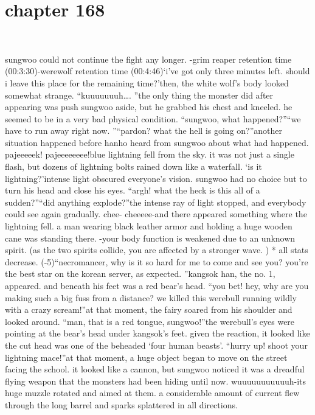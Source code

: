 \section{chapter 168}

                             




sungwoo could not continue the fight any longer.
-grim reaper retention time (00:3:30)-werewolf retention time (00:4:46)‘i’ve got only three minutes left.
 should i leave this place for the remaining time?’then, the white wolf’s body looked somewhat strange.
“kuuuuuuuh….
”the only thing the monster did after appearing was push sungwoo aside, but he grabbed his chest and kneeled.
 he seemed to be in a very bad physical condition.
“sungwoo, what happened?”“we have to run away right now.
”“pardon? what the hell is going on?”another situation happened before hanho heard from sungwoo about what had happened.
pajeeeeek! pajeeeeeeee!blue lightning fell from the sky.
 it was not just a single flash, but dozens of lightning bolts rained down like a waterfall.
‘is it lightning?’intense light obscured everyone’s vision.
 sungwoo had no choice but to turn his head and close his eyes.
“argh! what the heck is this all of a sudden?”“did anything explode?”the intense ray of light stopped, and everybody could see again gradually.
chee- cheeeee-and there appeared something where the lightning fell.
 a man wearing black leather armor and holding a huge wooden cane was standing there.
-your body function is weakened due to an unknown spirit.
 (as the two spirits collide, you are affected by a stronger wave.
)
* all stats decrease.
 (-5)“necromancer, why is it so hard for me to come and see you? you’re the best star on the korean server, as expected.
”kangsok han, the no.
 1, appeared.
 and beneath his feet was a red bear’s head.
“you bet! hey, why are you making such a big fuss from a distance? we killed this werebull running wildly with a crazy scream!”at that moment, the fairy soared from his shoulder and looked around.
“man, that is a red tongue, sungwoo!”the werebull’s eyes were pointing at the bear’s head under kangsok’s feet.
given the reaction, it looked like the cut head was one of the beheaded ‘four human beasts’.
“hurry up! shoot your lightning mace!”at that moment, a huge object began to move on the street facing the school.
 it looked like a cannon, but sungwoo noticed it was a dreadful flying weapon that the monsters had been hiding until now.
wuuuuuuuuuuuh-its huge muzzle rotated and aimed at them.
 a considerable amount of current flew through the long barrel and sparks splattered in all directions.
